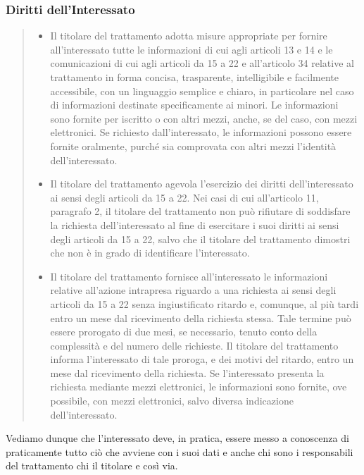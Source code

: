 \subsubsection*{Diritti dell'Interessato}
\begin{quote}
    \begin{itemize}
        \item Il titolare del trattamento adotta misure appropriate per fornire all'interessato tutte le informazioni di cui agli articoli 13 e 14 e le comunicazioni di cui agli articoli da 15 a 22 e all'articolo 34 relative al trattamento in forma concisa, trasparente, intelligibile e facilmente accessibile, con un linguaggio semplice e chiaro, in particolare nel caso di informazioni destinate specificamente ai minori. Le informazioni sono fornite per iscritto o con altri mezzi, anche, se del caso, con mezzi elettronici. Se richiesto dall'interessato, le informazioni possono essere fornite oralmente, purché sia comprovata con altri mezzi l'identità dell'interessato.
        \item Il titolare del trattamento agevola l'esercizio dei diritti dell'interessato ai sensi degli articoli da 15 a 22. Nei casi di cui all'articolo 11, paragrafo 2, il titolare del trattamento non può rifiutare di soddisfare la richiesta dell'interessato al fine di esercitare i suoi diritti ai sensi degli articoli da 15 a 22, salvo che il titolare del trattamento dimostri che non è in grado di identificare l'interessato.
        \item Il titolare del trattamento fornisce all'interessato le informazioni relative all'azione intrapresa riguardo a una richiesta ai sensi degli articoli da 15 a 22 senza ingiustificato ritardo e, comunque, al più tardi entro un mese dal ricevimento della richiesta stessa. Tale termine può essere prorogato di due mesi, se necessario, tenuto conto della complessità e del numero delle richieste. Il titolare del trattamento informa l'interessato di tale proroga, e dei motivi del ritardo, entro un mese dal ricevimento della richiesta. Se l'interessato presenta la richiesta mediante mezzi elettronici, le informazioni sono fornite, ove possibile, con mezzi elettronici, salvo diversa indicazione dell'interessato.
    \end{itemize}
\end{quote}
Vediamo dunque che l'interessato deve, in pratica, essere messo a conoscenza di praticamente tutto ciò che avviene con i suoi dati e anche chi sono i responsabili del trattamento chi il titolare e così via.
